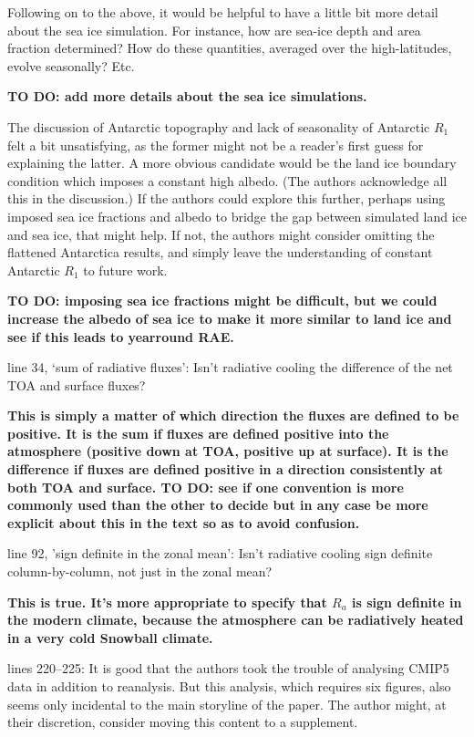 \documentclass{article}
\begin{document}
Following on to the above, it would be helpful to have a little bit more detail about the sea ice simulation. For instance, how are sea-ice depth and area fraction determined? How do these quantities, averaged over the high-latitudes, evolve seasonally? Etc.

{\color{red}\textbf{TO DO: add more details about the sea ice simulations.}}

The discussion of Antarctic topography and lack of seasonality of Antarctic $R_1$ felt a bit unsatisfying, as the former might not be a reader's first guess for explaining the latter. A more obvious candidate would be the land ice boundary condition which imposes a constant high albedo. (The authors acknowledge all this in the discussion.) If the authors could explore this further, perhaps using imposed sea ice fractions and albedo to bridge the gap between simulated land ice and sea ice, that might help. If not, the authors might consider omitting the flattened Antarctica results, and simply leave the understanding of constant Antarctic $R_1$ to future work.

{\color{red}\textbf{TO DO: imposing sea ice fractions might be difficult, but we could increase the albedo of sea ice to make it more similar to land ice and see if this leads to yearround RAE.}}

line 34, `sum of radiative fluxes': Isn't radiative cooling the difference of the net TOA and surface fluxes?

{\color{red}\textbf{This is simply a matter of which direction the fluxes are defined to be positive. It is the sum if fluxes are defined positive into the atmosphere (positive down at TOA, positive up at surface). It is the difference if fluxes are defined positive in a direction consistently at both TOA and surface. TO DO: see if one convention is more commonly used than the other to decide but in any case be more explicit about this in the text so as to avoid confusion.}}

line 92, 'sign definite in the zonal mean': Isn't radiative cooling sign definite column-by-column, not just in the zonal mean?

{\color{red}\textbf{This is true. It's more appropriate to specify that $R_a$ is sign definite in the modern climate, because the atmosphere can be radiatively heated in a very cold Snowball climate.}}

lines 220--225: It is good that the authors took the trouble of analysing CMIP5 data in addition to reanalysis. But this analysis, which requires six figures, also seems only incidental to the main storyline of the paper. The author might, at their discretion, consider moving this content to a supplement.
\end{document}

